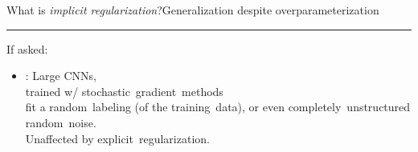 \documentclass[handout,usenames,dvipsnames]{beamer} %
\begin{document}
\begin{frame}{What is \emph{implicit regularization}?}{Generalization despite overparameterization}
{        \vspace*{\fill}
        \noindent\rule{\textwidth}{1pt}
        \newline
        \alert{If asked:}
        \begin{itemize}
            \item \cite{zhang2017understanding}: Large CNNs,\\
            trained w/ stochastic~gradient~methods\\
            fit a random~labeling (of the training~data), or even completely~unstructured random~noise.\\
            Unaffected by explicit~regularization.
        \end{itemize}
    }
\end{frame}
\end{document}
